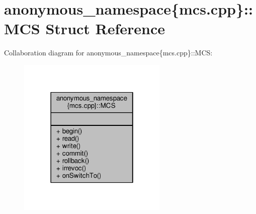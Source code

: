 \hypertarget{structanonymous__namespace_02mcs_8cpp_03_1_1MCS}{\section{anonymous\-\_\-namespace\{mcs.\-cpp\}\-:\-:M\-C\-S Struct Reference}
\label{structanonymous__namespace_02mcs_8cpp_03_1_1MCS}
}


Collaboration diagram for anonymous\-\_\-namespace\{mcs.\-cpp\}\-:\-:M\-C\-S\-:
\nopagebreak
\begin{figure}[H]
\begin{center}
\leavevmode
\includegraphics[width=202pt]{structanonymous__namespace_02mcs_8cpp_03_1_1MCS__coll__graph}
\end{center}
\end{figure}
